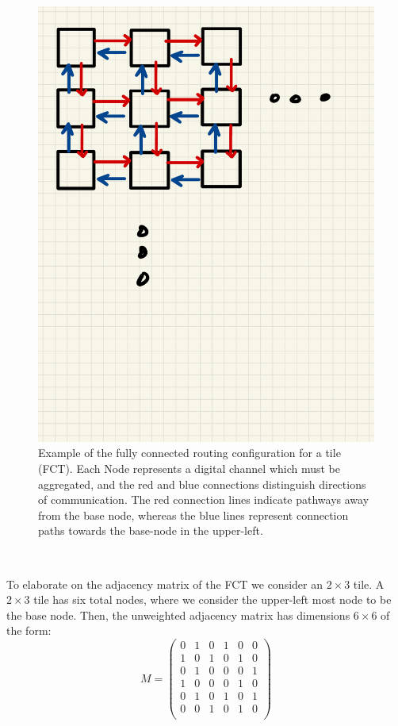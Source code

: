 \begin{figure}[]
\centering
\includegraphics[width=\textwidth]{images/Notes.pdf}
\caption{Example of the fully connected routing configuration for a tile (FCT). Each Node represents a digital channel which must be aggregated, and the red and blue connections distinguish directions of communication. The red connection lines indicate pathways away from the base node, whereas the blue lines represent connection paths towards the base-node in the upper-left.}
\end{figure}~\label{fig:fc_tile}

To elaborate on the adjacency matrix of the FCT we consider an $2\times 3$ tile.
A $2\times 3$ tile has six total nodes, where we consider the upper-left most node to be the base node.
Then, the unweighted adjacency matrix has dimensions $6\times6$ of the form:
\begin{equation}
M =
 \begin{pmatrix}
 0 & 1 & 0 & 1 & 0 & 0 \\
 1 & 0 & 1 & 0 & 1 & 0 \\
 0 & 1 & 0 & 0 & 0 & 1 \\
 1 & 0 & 0 & 0 & 1 & 0 \\
 0 & 1 & 0 & 1 & 0 & 1 \\
 0 & 0 & 1 & 0 & 1 & 0 \\
 \end{pmatrix}
\end{equation}~\label{eq:adjacency_matr}

